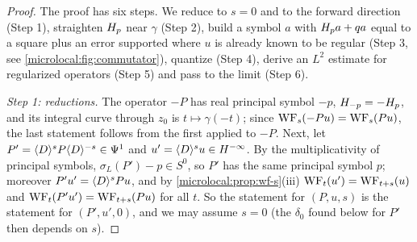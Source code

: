 \begin{proof}
  The proof has six steps. We reduce to $s=0$ and to the forward direction
  (Step 1), straighten $H_{p}$ near $\gamma$ (Step 2), build a symbol $a$
  with $H_{p}a+qa$ equal to a square plus an error supported where $u$
  is already known to be regular (Step 3, see \cref{microlocal:fig:commutator}),
  quantize (Step 4), derive an $L^2$ estimate for regularized operators
  (Step 5) and pass to the limit (Step 6).

  \emph{Step 1: reductions.} The operator $-P$ has real principal symbol $-p$,
  $H_{-p}=-H_{p}$, and its integral curve through $z_0$ is $t\mapsto\gamma(-t)$;
  since $\operatorname{WF}_s(-Pu)=\operatorname{WF}_s(Pu)$, the last statement follows from the first
  applied to $-P$. Next, let $P'=\langle D\rangle^sP\langle D\rangle^{-s}\in\Psi^{1}$ and
  $u'=\langle D\rangle^su\in H^{-\infty}$. By the multiplicativity of principal symbols,
  $\sigma_L(P')-p\in S^0$, so $P'$ has the same principal symbol $p$; moreover
  $P'u'=\langle D\rangle^sPu$, and by \cref{microlocal:prop:wf-s}(iii)
  $\operatorname{WF}_t(u')=\operatorname{WF}_{t+s}(u)$ and $\operatorname{WF}_t(P'u')=\operatorname{WF}_{t+s}(Pu)$ for all $t$. So the
  statement for $(P,u,s)$ is the statement for $(P',u',0)$, and we may assume
  $s=0$ (the $\delta_0$ found below for $P'$ then depends on $s$).


\end{proof}
